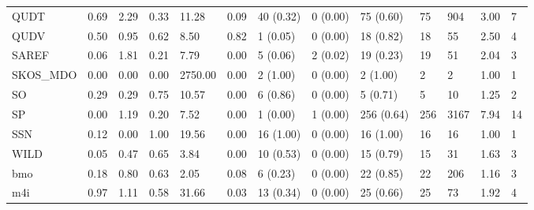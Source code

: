 \begin{table}
\begin{tabular}{m{3.5cm}m{2cm}m{2cm}m{2cm}m{2cm}m{2cm}m{2cm}m{2cm}m{2cm}m{2cm}m{2cm}m{2cm}m{2cm}}
QUDT                        &                0.69 &                  2.29 &                   0.33 &              11.28 &               0.09 &            40 (0.32) &   0 (0.00) &   75 (0.60) &   75 &             904 &     3.00 &          7 \\
QUDV                        &                0.50 &                  0.95 &                   0.62 &               8.50 &               0.82 &             1 (0.05) &   0 (0.00) &   18 (0.82) &   18 &              55 &     2.50 &          4 \\
SAREF                       &                0.06 &                  1.81 &                   0.21 &               7.79 &               0.00 &             5 (0.06) &   2 (0.02) &   19 (0.23) &   19 &              51 &     2.04 &          3 \\
SKOS\_MDO                    &                0.00 &                  0.00 &                   0.00 &            2750.00 &               0.00 &             2 (1.00) &   0 (0.00) &    2 (1.00) &    2 &               2 &     1.00 &          1 \\
SO                          &                0.29 &                  0.29 &                   0.75 &              10.57 &               0.00 &             6 (0.86) &   0 (0.00) &    5 (0.71) &    5 &              10 &     1.25 &          2 \\
SP                          &                0.00 &                  1.19 &                   0.20 &               7.52 &               0.00 &             1 (0.00) &   1 (0.00) &  256 (0.64) &  256 &            3167 &     7.94 &         14 \\
SSN                         &                0.12 &                  0.00 &                   1.00 &              19.56 &               0.00 &            16 (1.00) &   0 (0.00) &   16 (1.00) &   16 &              16 &     1.00 &          1 \\
WILD                        &                0.05 &                  0.47 &                   0.65 &               3.84 &               0.00 &            10 (0.53) &   0 (0.00) &   15 (0.79) &   15 &              31 &     1.63 &          3 \\
bmo                         &                0.18 &                  0.80 &                   0.63 &               2.05 &               0.08 &             6 (0.23) &   0 (0.00) &   22 (0.85) &   22 &             206 &     1.16 &          3 \\
m4i                         &                0.97 &                  1.11 &                   0.58 &              31.66 &               0.03 &            13 (0.34) &   0 (0.00) &   25 (0.66) &   25 &              73 &     1.92 &          4 \\

\end{tabular}
\end{table}
